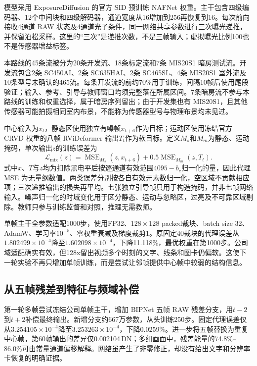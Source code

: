 \documentclass[11pt,a4paper,UTF8,fontset=fandol]{ctexart}
\newcommand{\dn}{\ensuremath{\,\mathrm{DN}}}
\begin{document}
模型采用 ExposureDiffusion 的官方 SID 预训练 NAFNet 权重。主干包含四级编码器、12个中间块和四级解码器，通道宽度从16增加到256再恢复到16。每次前向接收4通道 RAW 状态及4通道光子条件，同一网络共享参数进行三次曝光递推，并保留泊松采样。这里的“三次”是递推次数，不是三帧输入；虚拟曝光比例100也不是传感器增益标签。

本路线的45条流被分为20条开发流、18条标定流和7条 MIS20S1 暗房测试流。开发流包含2条 SC450AI、2条 SC635HAI、2条 SC465SL、4条 MIS20S1 室外流及10条型号未确认的465流。每条开发流的前约70\%用于训练，间隔10帧后使用尾段验证；输入、参考、引导与教师窗口均须完整落在所属区间。7条暗房流不参与本路线的训练和权重选择，属于暗房序列留出；由于开发集也有 MIS20S1，且其他传感器可能拍摄相同室内布景，不能称为传感器型号与物理布景均未见过。

中心输入为$x_t$，静态区使用独立有噪帧$x_{t+6}$作为目标；运动区使用冻结官方 CRVD 权重的八帧 RViDeformer 输出$T_t$作为软目标。定义$M_s$和$M_m$为静态、运动掩码，单次输出$z$的训练误差为
\begin{equation}
 \mathcal L_{\mathrm{mix}}(z)=
 \operatorname{MSE}_{M_s}(z,x_{t+6})
 +0.5\operatorname{MSE}_{M_m}(z,T_t).
 \label{eq:djc_mix}
\end{equation}
式中$x$、$T$与$z$均为扣除黑电平后按逐通道有效范围$4095-b_c$归一化的量，因此代理 MSE 为无量纲数值。两类误差分别按各自有效元素数归一化，空区域不贡献相应项；三次递推输出的损失再平均。七张独立引导帧只用于构造掩码，并非七帧网络输入。噪声归一化的时域变化用于区分静态、运动与忽略区，过亮及不可靠区域剔除。教师只参与训练监督和对照，推理无需教师。

单帧主干全参数适配1000步，使用FP32、$128\times128$ packed裁块、batch size 32、AdamW、学习率$10^{-5}$、零权重衰减及梯度裁剪1。原固定40裁块的代理误差从$1.802499\times10^{-4}$降至$1.602098\times10^{-4}$，下降11.118\%，最优权重在第1000步。公司域适配确实有效，但128x留出视频多个时刻的文字、线条和图卡仍偏软。这使下一轮实验不再只增加单帧训练，而是尝试让邻帧提供中心帧中较弱的结构信息。

\subsection{从五帧残差到特征与频域补偿}

第一轮多帧尝试冻结公司单帧主干，增加 BIPNet 五帧 RAW 残差分支，用$t-2$到$t+2$补偿最终输出。新增分支约667万参数，从头训练250步。固定代理误差仅从$3.254105\times10^{-4}$降至$3.253263\times10^{-4}$，下降0.0259\%。进一步将五帧替换为重复中心帧，第60帧输出的差异仅0.002104\dn；多组画面中，残差能量的74.8\%--86.0\%可由常量通道偏移解释。网络虽产生了非零修正，却没有给出文字和分辨率卡恢复的明确证据。
\end{document}
